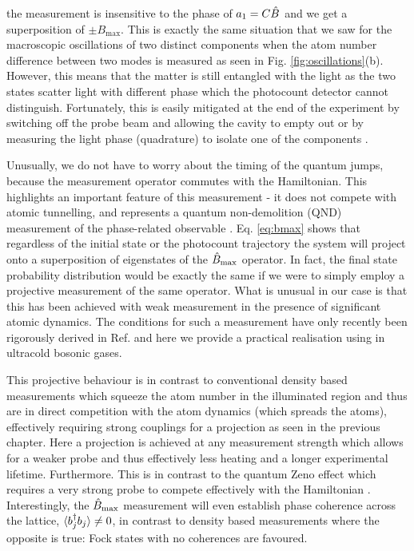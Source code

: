 the measurement is insensitive to the phase of $a_1 = C \hat{B}$ and we
get a superposition of $\pm B_\mathrm{max}$. This is exactly the same
situation that we saw for the macroscopic oscillations of two distinct
components when the atom number difference between two modes is
measured as seen in Fig. \ref{fig:oscillations}(b). However, this
means that the matter is still entangled with the light as the two
states scatter light with different phase which the photocount
detector cannot distinguish. Fortunately, this is easily mitigated at
the end of the experiment by switching off the probe beam and allowing
the cavity to empty out or by measuring the light phase (quadrature)
to isolate one of the components \cite{mekhov2009pra, mekhov2012,
  atoms2015}.

Unusually, we do not have to worry about the timing of the quantum
jumps, because the measurement operator commutes with the
Hamiltonian. This highlights an important feature of this measurement
- it does not compete with atomic tunnelling, and represents a quantum
non-demolition (QND) measurement of the phase-related observable
\cite{brune1992}. Eq. \eqref{eq:bmax} shows that regardless of the
initial state or the photocount trajectory the system will project
onto a superposition of eigenstates of the $\hat{B}_\mathrm{max}$ operator. In fact,
the final state probability distribution would be exactly the same if
we were to simply employ a projective measurement of the same
operator. What is unusual in our case is that this has been achieved
with weak measurement in the presence of significant atomic
dynamics. The conditions for such a measurement have only recently
been rigorously derived in Ref. \cite{weinberg2016} and here we
provide a practical realisation using in ultracold bosonic gases.

This projective behaviour is in contrast to conventional density based
measurements which squeeze the atom number in the illuminated region
and thus are in direct competition with the atom dynamics (which
spreads the atoms), effectively requiring strong couplings for a
projection as seen in the previous chapter. Here a projection is
achieved at any measurement strength which allows for a weaker probe
and thus effectively less heating and a longer experimental
lifetime. Furthermore. This is in contrast to the quantum Zeno effect
which requires a very strong probe to compete effectively with the
Hamiltonian \cite{misra1977, facchi2008, raimond2010, raimond2012,
  signoles2014}. Interestingly, the $\hat{B}_\mathrm{max}$ measurement will even
establish phase coherence across the lattice,
$\langle b^\dagger_j b_j \rangle \ne 0$, in contrast to density based
measurements where the opposite is true: Fock states with no
coherences are favoured.

